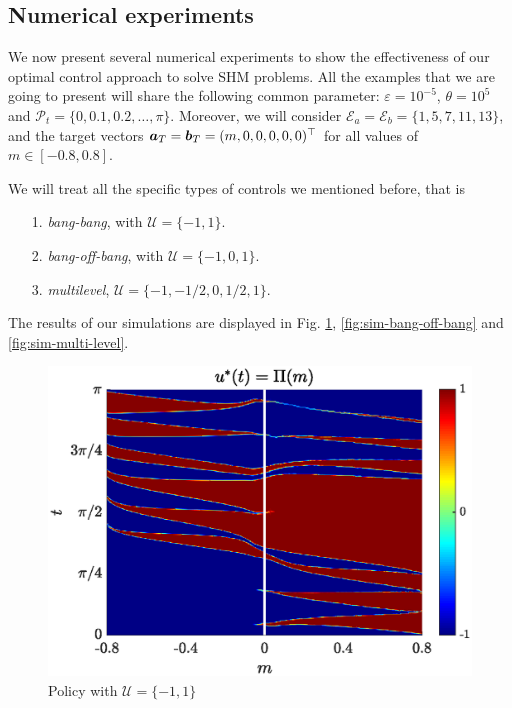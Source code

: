 \documentclass[twocolumn]{autart}    %
\begin{document}
\subsection{Numerical experiments}

We now present several numerical experiments to show the effectiveness of our optimal control approach to solve SHM problems. All the examples that we are going to present will share the following common parameter: $\varepsilon = 10^{-5}$, $\theta = 10^5$ and $\mathcal{P}_t = \{0,0.1,0.2,\dots,\pi\}$. Moreover, we will consider $\mathcal{E}_a = \mathcal{E}_b = \{1,5,7,11,13\}$, and the target vectors $\bm{a}_T = \bm{b}_T = (m,0,0,0,0,0)^\top$ for all values of $m \in [-0.8,0.8]$. 

We will treat all the specific types of controls we mentioned before, that is
\begin{itemize}
	\item[1.] \emph{bang-bang}, with $\mathcal{U} = \{-1,1\}$.
	\vspace{0.05cm}
	\item[2.] \emph{bang-off-bang}, with $\mathcal{U} = \{-1,0,1\}$. 
	\vspace{0.05cm}
	\item[3.] \textit{multilevel}, $\mathcal{U} = \{-1,-1/2,0,1/2,1\}$.
\end{itemize}

The results of our simulations are displayed in Fig. \ref{fig:sim-bang-bang}, \ref{fig:sim-bang-off-bang} and \ref{fig:sim-multi-level}.


\begin{figure}[ht!]
    \hspace{0.05em}
    \includegraphics[scale=0.525]{img/fig05.eps}
    \caption{Policy with $\mathcal{U}=\{-1,1\}$}\label{fig:sim-bang-bang}
\end{figure} 
\end{document}
